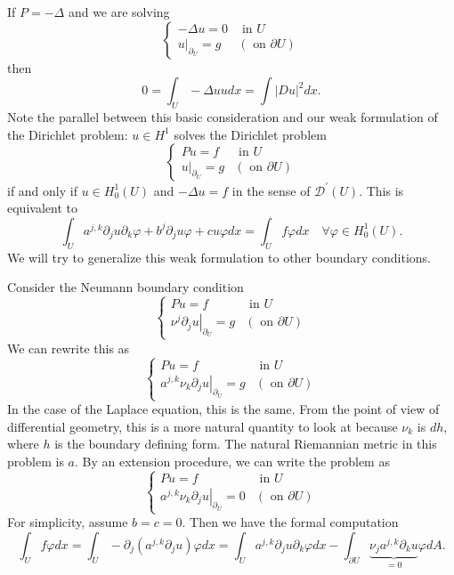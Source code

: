 \begin{example}
\label{eg: Wave equation}
If $P=-\Delta$ and we are solving
$$
\begin{cases}-\Delta u=0 & \text { in } U \\ \left.u\right|_{\partial_{U}}=g & (\text { on } \partial U)\end{cases}
$$
then
$$
0=\int_{U}-\Delta u u d x=\int|D u|^{2} d x .
$$
Note the parallel between this basic consideration and our weak formulation of the Dirichlet problem: $u \in H^{1}$ solves the Dirichlet problem
$$
\begin{cases}P u=f & \text { in } U \\ \left.u\right|_{\partial_{U}}=g & (\text { on } \partial U)\end{cases}
$$
if and only if $u \in H_{0}^{1}(U)$ and $-\Delta u=f$ in the sense of $\mathcal{D}^{\prime}(U)$. This is equivalent to
$$
\int_{U} a^{j, k} \partial_j u \partial_{k} \varphi+b^{j} \partial_{j} u \varphi+c u \varphi d x=\int_{U} f \varphi d x \quad \forall \varphi \in H_{0}^{1}(U) .
$$
We will try to generalize this weak formulation to other boundary conditions.
\end{example}


\begin{example}
\label{eg: Neumann boundary condition}
Consider the Neumann boundary condition
$$
\begin{cases}P u=f & \text { in } U \\ \left.\nu^{j} \partial_{j} u\right|_{\partial_{U}}=g & (\text { on } \partial U)\end{cases}
$$
We can rewrite this as
$$
\begin{cases}P u=f & \text { in } U \\ \left.a^{j, k} \nu_{k} \partial_{j} u\right|_{\partial_{U}}=g & (\text { on } \partial U)\end{cases}
$$
In the case of the Laplace equation, this is the same. From the point of view of differential geometry, this is a more natural quantity to look at because $\nu_{k}$ is $d h$, where $h$ is the boundary defining form. The natural Riemannian metric in this problem is $a$. By an extension procedure, we can write the problem as
$$
\begin{cases}P u=f & \text { in } U \\ \left.a^{j, k} \nu_{k} \partial_{j} u\right|_{\partial_{U}}=0 & (\text { on } \partial U)\end{cases}
$$
For simplicity, assume $b=c=0$. Then we have the formal computation
$$
\int_{U} f \varphi d x=\int_{U}-\partial_{j}\left(a^{j, k} \partial_{j} u\right) \varphi d x=\int_{U} a^{j, k} \partial_{j} u \partial_{k} \varphi d x-\int_{\partial U} \underbrace{\nu_{j} a^{j, k} \partial_{k} u}_{=0} \varphi d A .
$$
\end{example}

